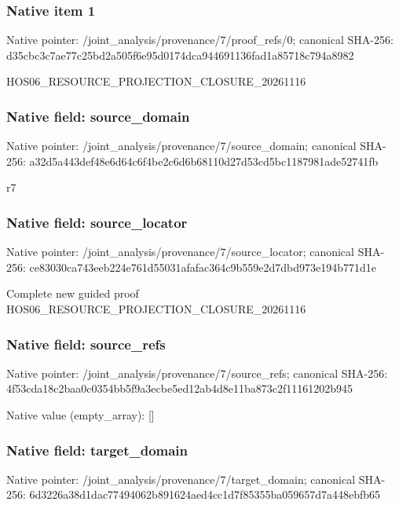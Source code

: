 \documentclass[10pt,a4paper]{article}
\begin{document}
\subsubsection{Native item 1}
Native pointer: /joint\_\allowbreak{}analysis/provenance/7/proof\_\allowbreak{}refs/0; canonical SHA-256: d35cbc3c7ae77c25bd2a505f6e95d0174dca944691136fad1a85718c794a8982

\begingroup\raggedright\sloppy HOS06\_\allowbreak{}RESOURCE\_\allowbreak{}PROJECTION\_\allowbreak{}CLOSURE\_\allowbreak{}20261116\par\endgroup

\subsubsection{Native field: source\_\allowbreak{}domain}
Native pointer: /joint\_\allowbreak{}analysis/provenance/7/source\_\allowbreak{}domain; canonical SHA-256: a32d5a443def48e6d64c6f4be2c6d6b68110d27d53cd5bc1187981ade52741fb

\begingroup\raggedright\sloppy r7\par\endgroup

\subsubsection{Native field: source\_\allowbreak{}locator}
Native pointer: /joint\_\allowbreak{}analysis/provenance/7/source\_\allowbreak{}locator; canonical SHA-256: ce83030ca743eeb224e761d55031afafac364c9b559e2d7dbd973e194b771d1e

\begingroup\raggedright\sloppy Complete new guided proof HOS06\_\allowbreak{}RESOURCE\_\allowbreak{}PROJECTION\_\allowbreak{}CLOSURE\_\allowbreak{}20261116\par\endgroup

\subsubsection{Native field: source\_\allowbreak{}refs}
Native pointer: /joint\_\allowbreak{}analysis/provenance/7/source\_\allowbreak{}refs; canonical SHA-256: 4f53cda18c2baa0c0354bb5f9a3ecbe5ed12ab4d8e11ba873c2f11161202b945

Native value (empty\_\allowbreak{}array): []

\subsubsection{Native field: target\_\allowbreak{}domain}
Native pointer: /joint\_\allowbreak{}analysis/provenance/7/target\_\allowbreak{}domain; canonical SHA-256: 6d3226a38d1dac77494062b891624aed4cc1d7f85355ba059657d7a448ebfb65
\end{document}
